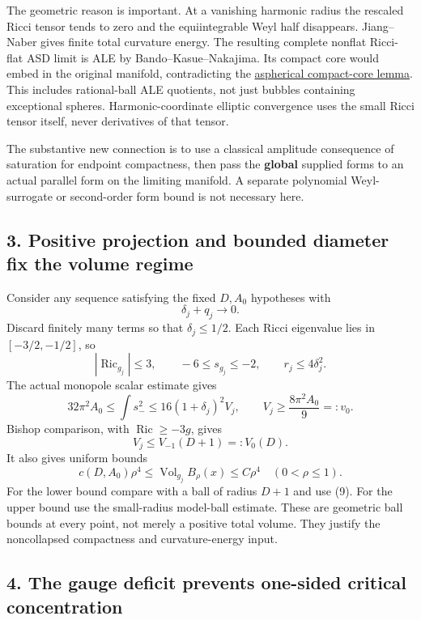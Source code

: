\documentclass[
  11pt,
]{article}
\begin{document}
The geometric reason is important. At a vanishing harmonic radius the
rescaled Ricci tensor tends to zero and the equiintegrable Weyl half
disappears. Jiang--Naber gives finite total curvature energy. The
resulting complete nonflat Ricci-flat ASD limit is ALE by
Bando--Kasue--Nakajima. Its compact core would embed in the original
manifold, contradicting the
\href{../mathematics/current/line1_aspherical_no_bubbles.md}{aspherical
compact-core lemma}. This includes rational-ball ALE quotients, not just
bubbles containing exceptional spheres. Harmonic-coordinate elliptic
convergence uses the small Ricci tensor itself, never derivatives of
that tensor.

The substantive new connection is to use a classical amplitude
consequence of saturation for endpoint compactness, then pass the
\textbf{global} supplied forms to an actual parallel form on the
limiting manifold. A separate polynomial Weyl-surrogate or second-order
form bound is not necessary here.

\hypertarget{positive-projection-and-bounded-diameter-fix-the-volume-regime}{%
\subsection{3. Positive projection and bounded diameter fix the volume
regime}\label{positive-projection-and-bounded-diameter-fix-the-volume-regime}}

Consider any sequence satisfying the fixed \(D,A_0\) hypotheses with \[
                    \delta_j+q_j\longrightarrow0.
 \tag{7}
\] Discard finitely many terms so that \(\delta_j\le1/2\). Each Ricci
eigenvalue lies in \([-3/2,-1/2]\), so \[
 |\operatorname{Ric}_{g_j}|\le3,
 \qquad -6\le s_{g_j}\le-2,
 \qquad r_j\le4\delta_j^2.
 \tag{8}
\] The actual monopole scalar estimate gives \[
 32\pi^2 A_0\le\int s_-^2
       \le16(1+\delta_j)^2V_j,
 \qquad V_j\ge\frac{8\pi^2A_0}{9}=:v_0.
 \tag{9}
\] Bishop comparison, with \(\operatorname{Ric}\ge-3g\), gives \[
                  V_j\le V_{-1}(D+1)=:V_0(D).
 \tag{10}
\] It also gives uniform bounds \[
 c(D,A_0)\rho^4\le\operatorname{Vol}_{g_j}B_\rho(x)
                         \le C\rho^4\quad(0<\rho\le1).
 \tag{11}
\] For the lower bound compare with a ball of radius \(D+1\) and use
(9). For the upper bound use the small-radius model-ball estimate. These
are geometric ball bounds at every point, not merely a positive total
volume. They justify the noncollapsed compactness and curvature-energy
input.

\hypertarget{the-gauge-deficit-prevents-one-sided-critical-concentration}{%
\subsection{4. The gauge deficit prevents one-sided critical
concentration}\label{the-gauge-deficit-prevents-one-sided-critical-concentration}}
\end{document}
